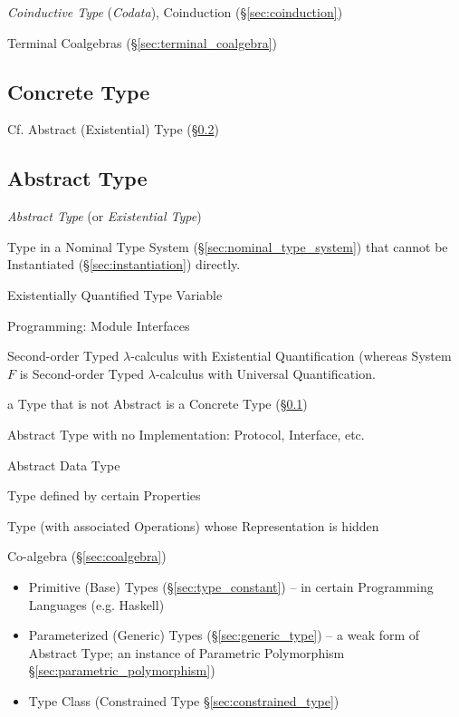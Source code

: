 \emph{Coinductive Type} (\emph{Codata}), Coinduction
(\S\ref{sec:coinduction})

Terminal Coalgebras (\S\ref{sec:terminal_coalgebra})



\subsection{Concrete Type}\label{sec:concrete_type}

\fist Cf. Abstract (Existential) Type (\S\ref{sec:abstract_type})



\subsection{Abstract Type}\label{sec:abstract_type}

\emph{Abstract Type} (or \emph{Existential Type})

Type in a Nominal Type System (\S\ref{sec:nominal_type_system}) that
cannot be Instantiated (\S\ref{sec:instantiation}) directly.

Existentially Quantified Type Variable

Programming: Module Interfaces

Second-order Typed $\lambda$-calculus with Existential Quantification
(whereas System $F$ is Second-order Typed $\lambda$-calculus with
Universal Quantification.

a Type that is not Abstract is a Concrete Type
(\S\ref{sec:concrete_type})

Abstract Type with no Implementation: Protocol, Interface, etc.


\asterism


Abstract Data Type

Type defined by certain Properties %

Type (with associated Operations) whose Representation is hidden

Co-algebra (\S\ref{sec:coalgebra})

\begin{itemize}
  \item Primitive (Base) Types (\S\ref{sec:type_constant}) -- in
    certain Programming Languages (e.g. Haskell)
  \item Parameterized (Generic) Types (\S\ref{sec:generic_type}) -- a
    weak form of Abstract Type; an instance of Parametric Polymorphism
    \S\ref{sec:parametric_polymorphism})
  \item Type Class (Constrained Type \S\ref{sec:constrained_type})
\end{itemize}

